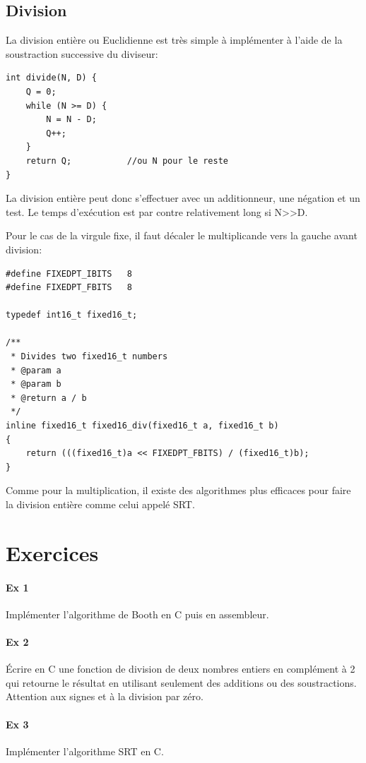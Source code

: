 \subsection{Division}
La division entière ou Euclidienne est très simple à implémenter à l'aide de la soustraction successive du diviseur:

\lstset{style=customc}
\begin{lstlisting}
int divide(N, D) {
	Q = 0;
	while (N >= D) {
  		N = N - D;
  		Q++;
	}
	return Q;			//ou N pour le reste
}
\end{lstlisting}

La division entière peut donc s'effectuer avec un additionneur, une négation et un test. Le temps d'exécution est par contre relativement long si N>>D.

Pour le cas de la virgule fixe, il faut décaler le multiplicande vers la gauche avant division:

\lstset{style=customc}
\begin{lstlisting}
#define FIXEDPT_IBITS	8
#define FIXEDPT_FBITS	8

typedef int16_t fixed16_t;

/**
 * Divides two fixed16_t numbers
 * @param a
 * @param b
 * @return a / b
 */
inline fixed16_t fixed16_div(fixed16_t a, fixed16_t b)
{
	return (((fixed16_t)a << FIXEDPT_FBITS) / (fixed16_t)b);
}
\end{lstlisting}

Comme pour la multiplication, il existe des algorithmes plus efficaces pour faire la division entière comme celui appelé SRT.

\section{Exercices}

\paragraph{Ex 1}
Implémenter l'algorithme de Booth en C puis en assembleur.

\paragraph{Ex 2}
Écrire en C une fonction de division de deux nombres entiers en complément à 2 qui retourne le résultat en utilisant seulement des additions ou des soustractions. Attention aux signes et à la division par zéro.

\paragraph{Ex 3}
Implémenter l'algorithme SRT en C.



